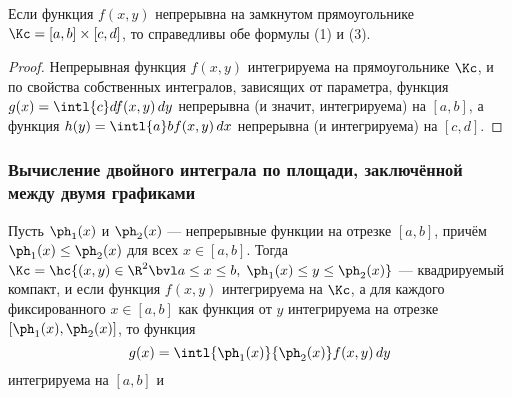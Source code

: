 \documentclass[a4paper]{article}
\begin{document}
\begin{imp}
Если функция $f(x,y)$ непрерывна на замкнутом прямоугольнике
$\Kc=[a,b]\times[c,d]$, то справедливы обе формулы (1) и (3).
\end{imp}

\begin{proof}
Непрерывная функция $f(x,y)$ интегрируема на прямоугольнике $\Kc$, и
по свойства собственных интегралов, зависящих от параметра, функция
$g(x)=\intl{c}d f(x,y)\,dy$ непрерывна (и значит, интегрируема) на
$[a,b]$, а функция $h(y) = \intl{a}b f(x,y)\,dx$ непрерывна (и
интегрируема) на $[c,d]$.
\end{proof}

\subsubsection{Вычисление двойного интеграла по площади, заключённой
между двумя графиками} \label{152}
\begin{theorem}
\label{thm522} Пусть $\ph_1(x)$ и $\ph_2(x)$ --- непрерывные функции
на отрезке $[a,b]$, причём $\ph_1(x)\le\ph_2(x)$ для всех
$x\in[a,b]$. Тогда $\Kc = \hc{(x,y)\in\R^2 \bvl a\le x\le b, \;
\ph_1(x)\le y\le\ph_2(x)}$ --- квадрируемый компакт, и если функция
$f(x,y)$ интегрируема на $\Kc$, а для каждого фиксированного
$x\in[a,b]$ как функция от $y$ интегрируема на отрезке
$[\ph_1(x),\ph_2(x)]$, то функция $$g(x)=\intl{\ph_1(x)}{\ph_2(x)}
f(x,y)\,dy$$ интегрируема на $[a,b]$ и 
\end{theorem}

\end{document}
